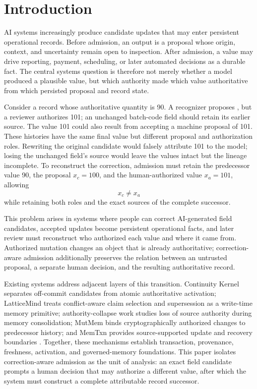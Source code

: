 \section{Introduction}
\label{sec:introduction}

AI systems increasingly produce candidate updates that may enter persistent operational records. Before admission, an output is a proposal whose origin, context, and uncertainty remain open to inspection. After admission, a value may drive reporting, payment, scheduling, or later automated decisions as a durable fact. The central systems question is therefore not merely whether a model produced a plausible value, but which authority made which value authoritative from which persisted proposal and record state.

Consider a record whose authoritative quantity is 90. A recognizer proposes , but a reviewer authorizes 101; an unchanged batch-code field should retain its earlier source. The value 101 could also result from accepting a machine proposal of 101. These histories have the same final value but different proposal and authorization roles. Rewriting the original candidate would falsely attribute 101 to the model; losing the unchanged field's source would leave the values intact but the lineage incomplete. To reconstruct the correction, admission must retain the predecessor value 90, the proposal $x_c=100$, and the human-authorized value $x_a=101$, allowing
\begin{equation}
x_c\neq x_a
\label{eq:intro-correction}
\end{equation}
while retaining both roles and the exact sources of the complete successor.

This problem arises in systems where people can correct AI-generated field candidates, accepted updates become persistent operational facts, and later review must reconstruct who authorized each value and where it came from. Authorized mutation changes an object that is already authoritative; correction-aware admission additionally preserves the relation between an untrusted proposal, a separate human decision, and the resulting authoritative record.

Existing systems address adjacent layers of this transition. Continuity Kernel separates off-commit candidates from atomic authoritative activation; LatticeMind treats conflict-aware claim selection and supersession as a write-time memory primitive; authority-collapse work studies loss of source authority during memory consolidation; MutMem binds cryptographically authorized changes to predecessor history; and MemTxn provides source-supported update and recovery boundaries \citep{he2026continuity,zhou2026latticemind,zhan2026authoritycollapse,saidi2026mutmem,cui2026memtxn}. Together, these mechanisms establish transaction, provenance, freshness, activation, and governed-memory foundations. This paper isolates correction-aware admission as the unit of analysis: an exact field candidate prompts a human decision that may authorize a different value, after which the system must construct a complete attributable record successor.

